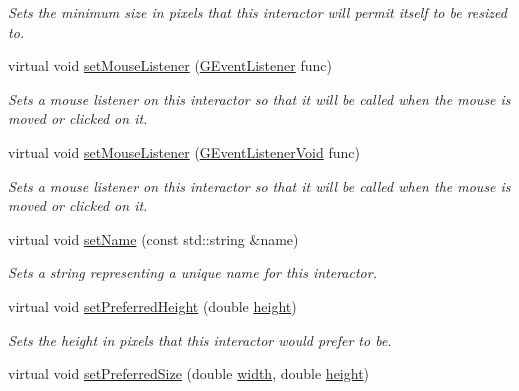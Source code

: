 \begin{DoxyCompactItemize}
\begin{DoxyCompactList}\small\item\em Sets the minimum size in pixels that this interactor will permit itself to be resized to. \end{DoxyCompactList}\item 
virtual void \mbox{\hyperlink{classsgl_1_1GInteractor_a37d8dbc943f59920f705b0104f60bde2}{set\+Mouse\+Listener}} (\mbox{\hyperlink{namespacesgl_ae9f3e9eab70035da1a2b114e21357b25}{G\+Event\+Listener}} func)
\begin{DoxyCompactList}\small\item\em Sets a mouse listener on this interactor so that it will be called when the mouse is moved or clicked on it. \end{DoxyCompactList}\item 
virtual void \mbox{\hyperlink{classsgl_1_1GInteractor_aea7f647ea62d59f71b5fad6aa65eeaf9}{set\+Mouse\+Listener}} (\mbox{\hyperlink{namespacesgl_a54427ce97bb1c2804e4fe2b0a62e8b17}{G\+Event\+Listener\+Void}} func)
\begin{DoxyCompactList}\small\item\em Sets a mouse listener on this interactor so that it will be called when the mouse is moved or clicked on it. \end{DoxyCompactList}\item 
virtual void \mbox{\hyperlink{classsgl_1_1GInteractor_a9d3a2685df23b5e7cbf59c19c4a1f9b5}{set\+Name}} (const std\+::string \&name)
\begin{DoxyCompactList}\small\item\em Sets a string representing a unique name for this interactor. \end{DoxyCompactList}\item 
virtual void \mbox{\hyperlink{classsgl_1_1GInteractor_a1ab987704fce32098706c6f00fb08218}{set\+Preferred\+Height}} (double \mbox{\hyperlink{classsgl_1_1GTable_ad3774f6419003470f54fd495124ef51f}{height}})
\begin{DoxyCompactList}\small\item\em Sets the height in pixels that this interactor would prefer to be. \end{DoxyCompactList}\item 
virtual void \mbox{\hyperlink{classsgl_1_1GInteractor_a042c5ae19430d765ef552371cae3632c}{set\+Preferred\+Size}} (double \mbox{\hyperlink{classsgl_1_1GTable_ad72663daf610f2a0833a2fc3d78e4fdf}{width}}, double \mbox{\hyperlink{classsgl_1_1GTable_ad3774f6419003470f54fd495124ef51f}{height}})

\end{DoxyCompactItemize}
